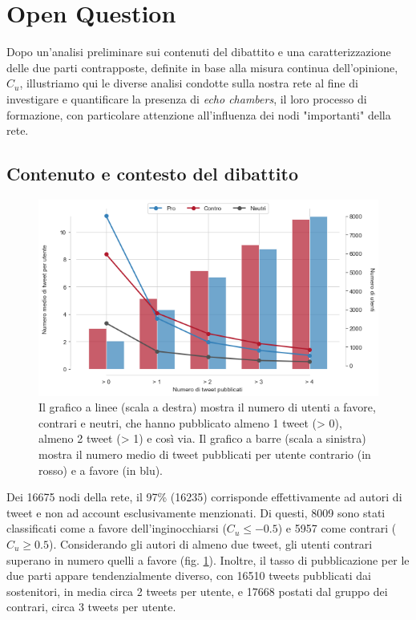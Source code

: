 \section{Open Question}\label{openq}
    Dopo un'analisi preliminare sui contenuti del dibattito e una caratterizzazione delle due parti contrapposte, definite in base alla misura continua dell'opinione, $C_{u}$, illustriamo qui le diverse analisi condotte sulla nostra rete al fine di investigare e quantificare la presenza di \textit{echo chambers}, il loro processo di formazione, con particolare attenzione all'influenza dei nodi "importanti" della rete. 
    
    \subsection{Contenuto e contesto del dibattito}
    
    \begin{figure}[b]
        \centering
        \includegraphics[scale=.36]{7_Open_question/ntweets.png}
        \caption{Il grafico a linee (scala a destra) mostra il numero di utenti a favore, contrari e neutri, che hanno pubblicato almeno 1 tweet (> 0), almeno 2 tweet (> 1) e così via. Il grafico a barre (scala a sinistra) mostra il numero medio di tweet pubblicati per utente contrario (in rosso) e a favore (in blu).}
        \label{andamentotweet}
    \end{figure}
    
    Dei 16675 nodi della  rete, il 97\% (16235) corrisponde effettivamente ad autori di tweet e non ad account esclusivamente menzionati. Di questi, 8009 sono stati classificati come a favore dell'inginocchiarsi ($C_{u} \leq -0.5$) e 5957 come contrari ($C_{u} \geq 0.5$). 
    Considerando gli autori di almeno due tweet, gli utenti contrari superano in numero quelli a favore (fig. \ref{andamentotweet}). Inoltre, il tasso di pubblicazione per le due parti appare tendenzialmente diverso, con 16510 tweets pubblicati dai sostenitori, in media circa 2 tweets per utente, e 17668 postati dal gruppo dei contrari, circa 3 tweets per utente.   
    
